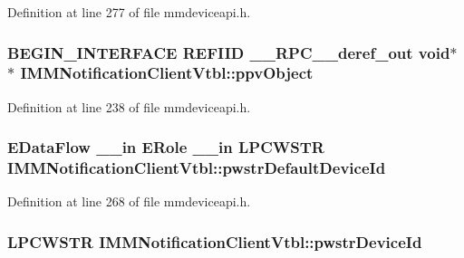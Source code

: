 Definition at line 277 of file mmdeviceapi.\+h.

\subsubsection[{\texorpdfstring{ppv\+Object}{ppvObject}}]{\setlength{\rightskip}{0pt plus 5cm}B\+E\+G\+I\+N\+\_\+\+I\+N\+T\+E\+R\+F\+A\+CE {\bf R\+E\+F\+I\+ID} {\bf \+\_\+\+\_\+\+R\+P\+C\+\_\+\+\_\+deref\+\_\+out} {\bf void}$\ast$$\ast$ I\+M\+M\+Notification\+Client\+Vtbl\+::ppv\+Object}\hypertarget{struct_i_m_m_notification_client_vtbl_a1b4e43842113132d3a016dd920709fe9}{}\label{struct_i_m_m_notification_client_vtbl_a1b4e43842113132d3a016dd920709fe9}


Definition at line 238 of file mmdeviceapi.\+h.

\subsubsection[{\texorpdfstring{pwstr\+Default\+Device\+Id}{pwstrDefaultDeviceId}}]{ {\bf E\+Data\+Flow} {\bf \+\_\+\+\_\+in} {\bf E\+Role} {\bf \+\_\+\+\_\+in} {\bf L\+P\+C\+W\+S\+TR} I\+M\+M\+Notification\+Client\+Vtbl\+::pwstr\+Default\+Device\+Id}\hypertarget{struct_i_m_m_notification_client_vtbl_a3103aa4d2922dc61fccc683297519049}{}\label{struct_i_m_m_notification_client_vtbl_a3103aa4d2922dc61fccc683297519049}


Definition at line 268 of file mmdeviceapi.\+h.

\subsubsection[{\texorpdfstring{pwstr\+Device\+Id}{pwstrDeviceId}}]{ {\bf L\+P\+C\+W\+S\+TR} I\+M\+M\+Notification\+Client\+Vtbl\+::pwstr\+Device\+Id}\hypertarget{struct_i_m_m_notification_client_vtbl_aa6e7eaf1605e744b878808890c8fac0e}{}\label{struct_i_m_m_notification_client_vtbl_aa6e7eaf1605e744b878808890c8fac0e}


